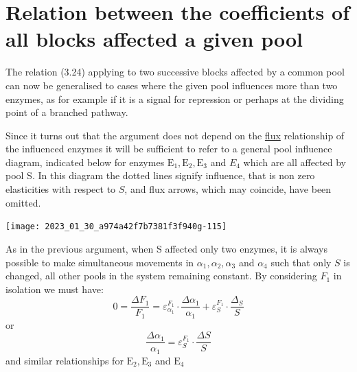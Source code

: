 \section{Relation between the coefficients of all blocks affected a given pool}

The relation (3.24) applying to two successive blocks affected by a common pool can now be generalised to cases where the given pool influences more than two enzymes, as for example if it is a signal for repression or perhaps at the dividing point of a branched pathway.

Since it turns out that the argument does not depend on the \underline{flux} relationship of the influenced enzymes it will be sufficient to refer to a general pool influence diagram, indicated below for enzymes $\mathrm{E}_{1}, \mathrm{E}_{2}, \mathrm{E}_{3}$ and $E_{4}$ which are all affected by pool S. In this diagram the dotted lines signify influence, that is non zero elasticities with respect to $S$, and flux arrows, which may coincide, have been omitted.

\begin{center}
\texttt{[image: 2023\_01\_30\_a974a42f7b7381f3f940g-115]}
\end{center}

As in the previous argument, when S affected only two enzymes, it is always possible to make simultaneous movements in $\alpha_{1}, \alpha_{2}, \alpha_{3}$ and $\alpha_{4}$ such that only $S$ is changed, all other pools in the system remaining constant. By considering $F_{1}$ in isolation we must have:
%
$$ 0 = \frac{\Delta F_1}{F_1} = \varepsilon_{\alpha_1}^{F_1} \cdot \frac{\Delta \alpha_1}{\alpha_1}+ \varepsilon^{F_1}_S \cdot \frac{\Delta_S}{S} $$
%
or
%
\begin{equation}
\frac{\Delta \alpha_{1}}{\alpha_{1}}=\varepsilon_{S}^{F_1} \cdot \frac{\Delta S}{S} \tag{a}
\label{eqn:324a}
\end{equation}
%
and similar relationships for $\mathrm{E}_{2}, \mathrm{E}_{3}$ and $\mathrm{E}_{4}$

